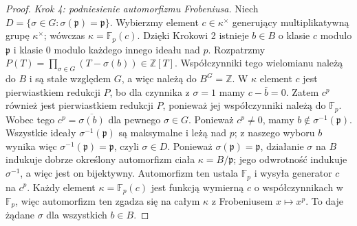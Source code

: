 \begin{proof}
\emph{Krok 4: podniesienie automorfizmu Frobeniusa.}
Niech $D=\{\sigma\in G:\sigma(\mathfrak p)=\mathfrak p\}$.
Wybierzmy element $c\in\kappa^\times$ generujący
multiplikatywną grupę $\kappa^\times$; wówczas
$\kappa=\mathbb F_p(c)$. Dzięki Krokowi 2 istnieje $b\in B$
o klasie $c$ modulo $\mathfrak p$ i klasie $0$ modulo
każdego innego ideału nad $p$.
Rozpatrzmy
$P(T)=\prod_{\sigma\in G}(T-\sigma(b))\in\mathbb Z[T]$.
Współczynniki tego wielomianu należą do $B$ i są stałe
względem $G$, a więc należą do $B^G=\mathbb Z$.
W $\kappa$ element $c$ jest pierwiastkiem redukcji $P$,
bo dla czynnika z $\sigma=1$ mamy $c-\bar b=0$.
Zatem $c^p$ również jest pierwiastkiem redukcji $P$,
ponieważ jej współczynniki należą do $\mathbb F_p$.
Wobec tego $c^p=\overline{\sigma(b)}$ dla pewnego $\sigma\in G$.
Ponieważ $c^p\ne0$, mamy $b\notin\sigma^{-1}(\mathfrak p)$.
Wszystkie ideały $\sigma^{-1}(\mathfrak p)$ są maksymalne i leżą nad $p$;
z naszego wyboru $b$ wynika więc
$\sigma^{-1}(\mathfrak p)=\mathfrak p$, czyli $\sigma\in D$.
Ponieważ $\sigma(\mathfrak p)=\mathfrak p$, działanie $\sigma$
na $B$ indukuje dobrze określony automorfizm ciała
$\kappa=B/\mathfrak p$; jego odwrotność indukuje
$\sigma^{-1}$, a więc jest on bijektywny. Automorfizm ten
ustala $\mathbb F_p$ i wysyła generator $c$ na $c^p$.
Każdy element $\kappa=\mathbb F_p(c)$ jest funkcją wymierną
$c$ o współczynnikach w $\mathbb F_p$, więc automorfizm ten
zgadza się na całym $\kappa$ z Frobeniusem
$x\mapsto x^p$. To daje żądane $\sigma$ dla wszystkich $b\in B$.
\end{proof}

